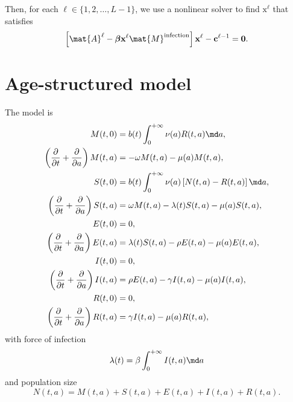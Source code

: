 \documentclass{jpmarticle}
\renewcommand{\vec}[1]{\boldsymbol{\mathrm{#1}}}
\begin{document}
Then, for each $\ell \in \{1, 2, \ldots, L - 1\}$,
we use a nonlinear solver to find $\vec{x}^{\ell}$ that satisfies
\begin{equation}
  \left[
    \mat{A}^{\ell}
    - \vec{\beta} \vec{x}^{\ell} \mat{M}^{\text{infection}}
  \right] \vec{x}^{\ell}
  - \vec{c}^{\ell - 1}
  = \vec{0}.
\end{equation}


\section{Age-structured model}

The model is
\begin{equation}
  \label{model_age_structured}
  \begin{split}
    M(t, 0)
    &= b(t) \int_0^{+\infty} \nu(a) R(t, a) \md a,
    \\
    \left(\frac{\partial}{\partial t}
      + \frac{\partial}{\partial a}\right)
    M(t, a)
    &= - \omega M(t, a) - \mu(a) M(t, a),
    \\
    S(t, 0)
    &= b(t) \int_0^{+\infty} \nu(a) \left[N(t, a) - R(t, a)\right] \md a,
    \\
    \left(\frac{\partial}{\partial t}
      + \frac{\partial}{\partial a}\right)
    S(t, a)
    &= \omega M(t, a) - \lambda(t) S(t, a) - \mu(a) S(t, a),
    \\
    E(t, 0)
    &= 0,
    \\
    \left(\frac{\partial}{\partial t}
      + \frac{\partial}{\partial a}\right)
    E(t, a)
    &= \lambda(t) S(t, a) - \rho E(t, a) - \mu(a) E(t, a),
    \\
    I(t, 0)
    &= 0,
    \\
    \left(\frac{\partial}{\partial t}
      + \frac{\partial}{\partial a}\right)
    I(t, a)
    &= \rho E(t, a) - \gamma I(t, a) - \mu(a) I(t, a),
    \\
    R(t, 0)
    &= 0,
    \\
    \left(\frac{\partial}{\partial t}
      + \frac{\partial}{\partial a}\right)
    R(t, a)
    &= \gamma I(t, a) - \mu(a) R(t, a),
  \end{split}
\end{equation}
with force of infection
\begin{equation}
  \lambda(t) = \beta \int_0^{+\infty} I(t, a) \md a
\end{equation}
and population size
\begin{equation}
  N(t, a) = M(t, a) + S(t, a) + E(t, a) + I(t, a) + R(t, a).
\end{equation}
\end{document}

